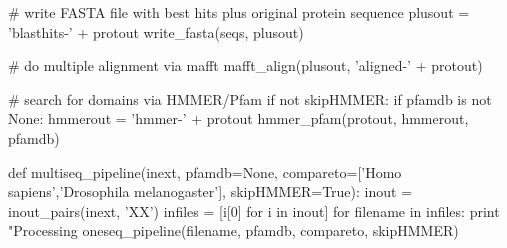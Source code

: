 \documentclass[10pt,letterpaper]{scrartcl}
\begin{document}
\begin{python}
    # write FASTA file with best hits plus original protein sequence
    plusout = 'blasthits-' + protout
    write_fasta(seqs, plusout)     
    
    # do multiple alignment via mafft
    mafft_align(plusout, 'aligned-' + protout)

    # search for domains via HMMER/Pfam     
    if not skipHMMER:  
        if pfamdb is not None: 
            hmmerout = 'hmmer-' + protout
            hmmer_pfam(protout, hmmerout, pfamdb)         
                        
def multiseq_pipeline(inext, pfamdb=None, 
                compareto=['Homo sapiens','Drosophila melanogaster'],
                skipHMMER=True):   
    inout = inout_pairs(inext, 'XX')
    infiles = [i[0] for i in inout]
    for filename in infiles:
        print "Processing %
        oneseq_pipeline(filename, pfamdb, compareto, skipHMMER)                          
    
\end{python}
\end{document}
